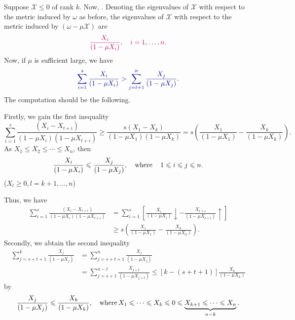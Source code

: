 \documentclass[lang=en,12pt]{beautybook}
\begin{document}
Suppose $\mathcal{X} \leqslant 0$ of rank $k$. Now,
. Denoting
{\color[HTML]{800080}the eigenvalues of $\mathcal{X}$ with respect to the
metric induced by $\omega$ as before}, {\color[HTML]{B4005A}the eigenvalues of
$\mathcal{X}$ with respect to the metric induced by $(\omega - \mu
\mathcal{X})$ are }
\[ {\color[HTML]{B4005A}\frac{X_i}{(1 - \mu X_i)}, \quad i = 1, \ldots, n.} \]
Now, if $\mu$ is sufficient large, we have
\begin{equation}
  \tmcolor{DarkBlue}{\sum_{i = 1}^s \frac{X_i}{(1 - \mu X_i)} > \sum_{j = t + 1}^n
  \frac{X_j}{(1 - \mu X_j)} .} \label{4}
\end{equation}
The computation should be the following.

Firstly, we gain the first inequality
\[ \sum_{i = 1}^s \frac{(X_i - X_{t + i})}{(1 - \mu X_i) (1 - \mu X_{t + i})}
   \geqslant \frac{s (X_1 - X_k)}{(1 - \mu X_1) (1 - \mu X_k)} = s \left(
   \frac{X_1}{(1 - \mu X_1)} - \frac{X_k}{(1 - \mu X_k)} \right) . \]
As $X_1 \leqslant X_2 \leqslant \cdots \leqslant X_n$, then
\[ \frac{X_i}{(1 - \mu X_i)} \leqslant \frac{X_j}{(1 - \mu X_j)}, \quad
   \operatorname{where} \quad 1 \leqslant i \leqslant j \leqslant n. \]
 ($X_l
\geqslant 0, l = k + 1, \ldots, n$)

Thus, we have
\begin{align*}
  \sum_{i = 1}^s \frac{(X_i - X_{t + i})}{(1 - \mu X_i) (1 - \mu X_{t + i})}
   &= \sum_{i = 1}^s \left[ \frac{X_i}{(1 - \mu X_i)} \downarrow - \frac{X_{t +
   i}}{(1 - \mu X_{t + i})} \uparrow \right] \\
   &\geqslant s \left( \frac{X_1}{(1
   - \mu X_1)} - \frac{X_k}{(1 - \mu X_k)} \right) . 
\end{align*}
Secondly, we abtain the second inequality
\begin{align*}
  \sum_{j = s + t + 1}^k \frac{X_j}{(1 - \mu X_j)} &= \sum_{j = s + t + 1}^n
   \frac{X_j}{(1 - \mu X_j)} \\
   &= \sum_{j = s + 1}^{n - t} \frac{X_{j + t}}{(1 -
   \mu X_{j + t})} \leqslant [k - (s + t + 1)] \frac{X_k}{(1 - \mu X_k)} 
\end{align*}
by
\[ \frac{X_j}{(1 - \mu X_j)} \leqslant \frac{X_k}{(1 - \mu X_k)}, \quad
   \operatorname{where} X_1 \leqslant \cdots \leqslant X_k \leqslant  0
   \leqslant\underbrace{ X_{k + 1} \leqslant \cdots \leqslant X_n}_{n - k} .
\]
\end{document}
